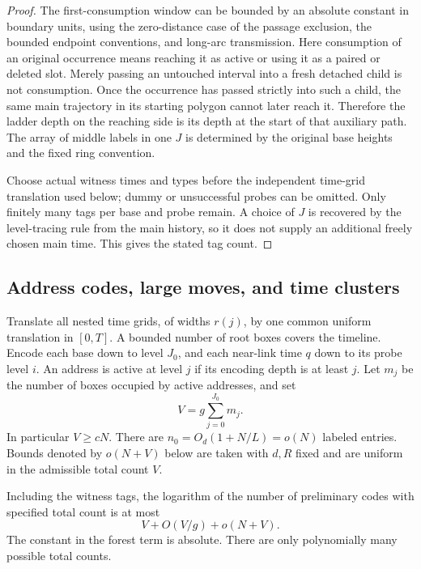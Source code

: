\begin{proof}
The first-consumption window can be bounded by an absolute constant in
boundary units, using the zero-distance case of the passage exclusion,
the bounded endpoint conventions, and long-arc transmission.  Here
consumption of an original occurrence means reaching it as active or
using it as a paired or deleted slot.  Merely passing an untouched
interval into a fresh detached child is not consumption.  Once the
occurrence has passed strictly into such a child, the same main
trajectory in its starting polygon cannot later reach it.  Therefore
the ladder depth on the reaching side is its depth at the start of
that auxiliary path.  The array of middle labels in one $J$ is
determined by the original base heights and the fixed ring convention.

Choose actual witness times and types before the independent time-grid
translation used below; dummy or unsuccessful probes can be omitted.
Only finitely many tags per base and probe remain.  A choice of $J$
is recovered by the level-tracing rule from the main history, so it
does not supply an additional freely chosen main time.  This gives
the stated tag count.
\end{proof}

\subsection{Address codes, large moves, and time clusters}

Translate all nested time grids, of widths $r(j)$, by one common
uniform translation in $[0,T]$.  A bounded number of root boxes covers
the timeline.  Encode each base down to level $J_0$, and each near-link
time $q$ down to its probe level $i$.  An address is active at level
$j$ if its encoding depth is at least $j$.  Let $m_j$ be the number
of boxes occupied by active addresses, and set
\begin{equation}\label{addr:volume-code}
                         V=g\sum_{j=0}^{J_0}m_j.
\end{equation}
In particular $V\ge cN$.  There are
$n_0=O_d(1+N/L)=o(N)$ labeled entries.  Bounds denoted by
$o(N+V)$ below are taken with $d,R$ fixed and are uniform in the
admissible total count $V$.

\begin{lemma}\label{addr:code-entropy}
Including the witness tags, the logarithm of the number of preliminary
codes with specified total count is at most
\begin{equation}\label{eq:original-20}
                       V+O(V/g)+o(N+V).
\end{equation}
The constant in the forest term is absolute.  There are only
polynomially many possible total counts.
\end{lemma}

